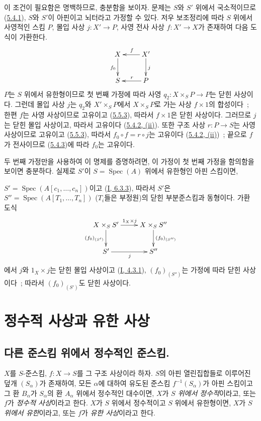 이 조건이 필요함은 명백하므로, 충분함을 보이자. 문제는 $S$와 $S'$ 위에서
국소적이므로 (\hyperref[II.5.4.1-ko]{5.4.1}), $S$와 $S'$이 아핀이고
뇌터라고 가정할 수 있다. 저우 보조정리에 따라 $S$ 위에서 사영적인 스킴
$P$, 몰입 사상 $j:X'\to P$, 사영 전사 사상 $f:X'\to X$가 존재하여
다음 도식이 가환한다.
\[
\xymatrix{
X\ar[d]_{f_0} & X'\ar[l]_f\ar[d]^j\\
S & P\ar[l]_r
}
\]
$P$는 $S$ 위에서 유한형이므로 첫 번째 가정에 따라 사영
$q_2:X\times_SP\to P$는 닫힌 사상이다. 그런데 몰입 사상 $j$는
$q_2$와 $X'\times_SP$에서 $X\times_SP$로 가는 사상 $f\times1$의
합성이다~; 한편 $f$는 사영 사상이므로 고유이고
(\hyperref[II.5.5.3-ko]{5.5.3}), 따라서 $f\times1$은 닫힌 사상이다.
그러므로 $j$는 닫힌 몰입 사상이고, 따라서 고유이다
(\hyperref[II.5.4.2-ko]{5.4.2, (ii)}). 또한 구조 사상 $r:P\to S$는
사영 사상이므로 고유이고 (\hyperref[II.5.5.3-ko]{5.5.3}), 따라서
$f_0\circ f=r\circ j$는 고유이다
(\hyperref[II.5.4.2-ko]{5.4.2, (ii)})~; 끝으로 $f$가 전사이므로
(\hyperref[II.5.4.3-ko]{5.4.3})에 따라 $f_0$는 고유이다.

두 번째 가정만을 사용하여 이 명제를 증명하려면, 이 가정이 첫 번째
가정을 함의함을 보이면 충분하다. 실제로 $S'$이
$S=\operatorname{Spec}(A)$ 위에서 유한형인 아핀 스킴이면,


$S'=\operatorname{Spec}(A[c_1,\ldots,c_n])$이고
(\hyperref[I.6.3.3-ko]{I, 6.3.3}), 따라서 $S'$은
$S''=\operatorname{Spec}(A[T_1,\ldots,T_n])$ ($T_i$들은 부정원)의
닫힌 부분준스킴과 동형이다. 가환 도식
\[
\xymatrix{
X\times_SS'\ar[r]^{1_X\times j}\ar[d]_{(f_0)_{(S')}} &
X\times_SS''\ar[d]^{(f_0)_{(S'')}}\\
S'\ar[r]_j & S''
}
\]
에서 $j$와 $1_X\times j$는 닫힌 몰입 사상이고
(\hyperref[I.4.3.1-ko]{I, 4.3.1}), $(f_0)_{(S'')}$는 가정에 따라 닫힌
사상이다~; 따라서 $(f_0)_{(S')}$도 닫힌 사상이다.

\section{정수적 사상과 유한 사상}
\label{section:II.6-ko}

\subsection{다른 준스킴 위에서 정수적인 준스킴.}
\label{subsection:II.6.1-ko}

\begin{definition}[6.1.1]
\label{II.6.1.1-ko}
$X$를 $S$-준스킴, $f:X\to S$를 그 구조 사상이라 하자. $S$의 아핀
열린집합들로 이루어진 덮개 $(S_\alpha)$가 존재하여, 모든 $\alpha$에
대하여 유도된 준스킴 $f^{-1}(S_\alpha)$가 아핀 스킴이고 그 환
$B_\alpha$가 $S_\alpha$의 환 $A_\alpha$ 위에서 정수적인 대수이면,
$X$가 \emph{$S$ 위에서 정수적}이라고, 또는 $f$가 \emph{정수적 사상}이라고
한다. $X$가 $S$ 위에서 정수적이고 $S$ 위에서 유한형이면, $X$가
\emph{$S$ 위에서 유한}이라고, 또는 $f$가 \emph{유한 사상}이라고 한다.
\end{definition}

